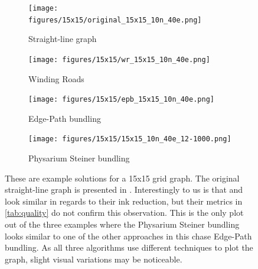 \begin{figure}[H]
    \begin{subfigure}{0.5\linewidth}
        \centering
        \texttt{[image: figures/15x15/original\_15x15\_10n\_40e.png]}
        \caption{Straight-line graph}
        \label{fig:original_15x15}
    \end{subfigure}
    \begin{subfigure}{0.5\linewidth}
        \centering
        \texttt{[image: figures/15x15/wr\_15x15\_10n\_40e.png]}
        \caption{Winding Roads}
        \label{fig:wr_15x15}
    \end{subfigure}
    \begin{subfigure}{0.5\linewidth}
        \centering
        \texttt{[image: figures/15x15/epb\_15x15\_10n\_40e.png]}
        \caption{Edge-Path bundling}
        \label{fig:epb_15x15}
    \end{subfigure}
    \begin{subfigure}{0.5\linewidth}
        \centering
        \texttt{[image: figures/15x15/15x15\_10n\_40e\_12-1000.png]}
        \caption{Physarium Steiner bundling}
        \label{fig:15x15}
    \end{subfigure}
  \caption{These are example solutions for a 15x15 grid graph. The original straight-line graph is presented in . Interestingly to us is that  and  look similar in regards to their ink reduction, but their metrics in \autoref{tab:quality} do not confirm this observation. This is the only plot out of the three examples where the Physarium Steiner bundling looks similar to one of the other approaches in this chase Edge-Path bundling.
  As all three algorithms use different techniques to plot the graph, slight visual variations may be noticeable.}
  \label{fig:15x15_figure}
\end{figure}

